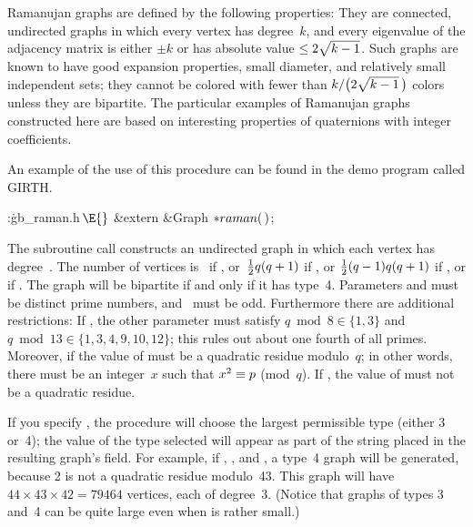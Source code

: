 Ramanujan graphs are defined by the following properties:
They are connected, undirected graphs in which every vertex has
degree~$k$, and every eigenvalue of the adjacency matrix
is either $\pm k$ or has absolute value $\le2\sqrt{\mathstrut k-1}$.
Such graphs are known to have good expansion properties, small diameter,
and relatively small independent sets; they cannot be colored with
fewer than $k/\bigl(2\sqrt{\mathstrut k-1}\,\bigr)$ colors unless they are
bipartite. The particular examples of Ramanujan graphs constructed here
are based on interesting properties of quaternions with integer coefficients.

An example of the use of this procedure can be found in the demo program
called {\sc GIRTH}.

\Y\B\4:\.{gb\_raman.h\,}\X${}\E{}$\6
\&{extern} \&{Graph} ${}{*}\\{raman}(\,){}$;\par
\fi

The subroutine call 
constructs an undirected graph in which each vertex has degree~.
The number of vertices is~ if , or~${1%
\over2}q(q+1)$ if ,
or ${1\over2}(q-1)q(q+1)$ if , or  if
. The graph will be bipartite if and only if it has
type~4.
Parameters  and  must be distinct prime numbers,
and ~must be odd. Furthermore there are additional restrictions:
If , the other parameter  must satisfy $q\bmod8\in%
\{1,3\}$
and $q\bmod13\in\{1,3,4,9,10,12\}$; this rules out about one fourth of
all primes. Moreover, if  the value of  must be a
quadratic residue modulo~$q$; in other words, there must be an
integer~$x$ such that $x^2\=p$ (mod~$q$). If , the value
of 
must not be a quadratic residue.

If you specify , the procedure
will choose the largest permissible type (either 3 or~4);
the value of the type selected will
appear as part of the string placed in the resulting graph's  field.
For example, if , , and , a type~4 graph will be
generated, because 2 is not a quadratic residue modulo~43. This
graph will have $44\times43\times42=79464$ vertices, each of degree~3.
(Notice that graphs of types 3 and~4 can be quite large even when
 is rather small.)

